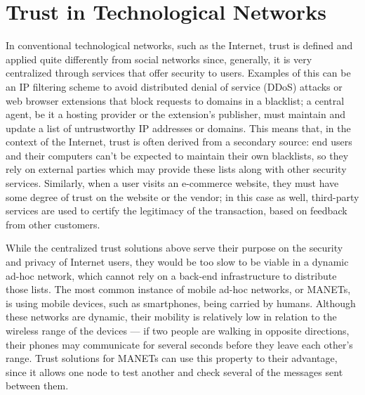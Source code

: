 \section{Trust in Technological Networks}
\label{section:trusttechnological}
In conventional technological networks, such as the Internet, trust is defined and applied quite differently from social networks since, generally, it is very centralized through services that offer security to users.
Examples of this can be an IP filtering scheme to avoid distributed denial of service (DDoS) attacks or web browser extensions that block requests to domains in a blacklist; a central agent, be it a hosting provider or the extension's publisher, must maintain and update a list of untrustworthy IP addresses or domains.
This means that, in the context of the Internet, trust is often derived from a secondary source: end users and their computers can't be expected to maintain their own blacklists, so they rely on external parties which may provide these lists along with other security services.
Similarly, when a user visits an e-commerce website, they must have some degree of trust on the website or the vendor; in this case as well, third-party services are used to certify the legitimacy of the transaction, based on feedback from other customers.

While the centralized trust solutions above serve their purpose on the security and privacy of Internet users, they would be too slow to be viable in a dynamic ad-hoc network, which cannot rely on a back-end infrastructure to distribute those lists.
The most common instance of mobile ad-hoc networks, or MANETs, is using mobile devices, such as smartphones, being carried by humans.
Although these networks are dynamic, their mobility is relatively low in relation to the wireless range of the devices — if two people are walking in opposite directions, their phones may communicate for several seconds before they leave each other's range.
Trust solutions for MANETs can use this property to their advantage, since it allows one node to test another and check several of the messages sent between them.


